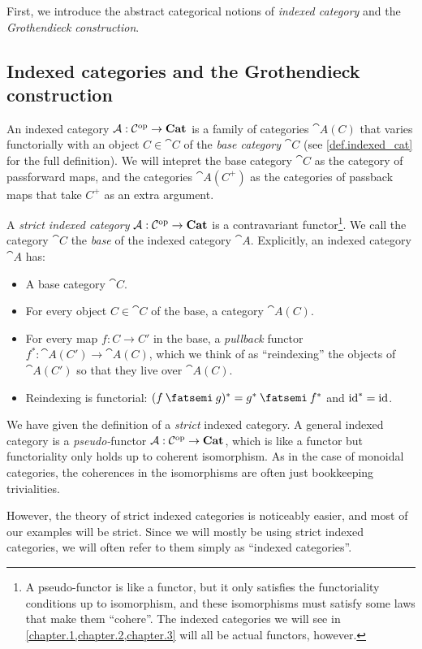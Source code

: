 \documentclass[DynamicalBook]{subfiles}
\begin{document}
First, we introduce the abstract categorical notions of \emph{indexed category}
and the \emph{Grothendieck construction}.




\subsection{Indexed categories and the Grothendieck construction}\label{sec.indexed_categories}

An indexed category $\mathcal{A} : \mathcal{C}^{\textnormal{op}} \to \textbf{Cat}$ is a family of
categories $\cat{A}(C)$ that varies functorially with an object $C \in \cat{C}$
of the \emph{base category} $\cat{C}$ (see \cref{def.indexed_cat} for the full
definition). We will intepret the base category $\cat{C}$ as the category of
passforward maps, and the categories $\cat{A}(C^+)$ as the categories of
passback maps that take $C^+$ as an extra argument.

\begin{definition}
  A \emph{strict indexed category} $\mathcal{A} : \mathcal{C}^{\textnormal{op}} \to \textbf{Cat}$ is a
  contravariant functor\footnote{A pseudo-functor is like a functor,
    but it only satisfies the functoriality conditions up to isomorphism, and
    these isomorphisms must satisfy some laws that make them ``cohere''. The
    indexed categories we will see in \cref{chapter.1,chapter.2,chapter.3}
    will all be actual functors, however.}. We call the category $\cat{C}$ the
  \emph{base} of the indexed category $\cat{A}$. Explicitly, an indexed
  category $\cat{A}$ has:
  \begin{itemize}
  \item A base category $\cat{C}$.
  \item For every object $C \in \cat{C}$ of the base, a category $\cat{A}(C)$.
  \item For every map $f : C \to C'$ in the base, a \emph{pullback} functor
    $f^{\ast} : \cat{A}(C') \to \cat{A}(C)$, which we think of as ``reindexing''
    the objects of $\cat{A}(C')$ so that they live over $\cat{A}(C)$.
  \item Reindexing is functorial: $(f \then g)^{\ast} = g^{\ast} \then f^{\ast}$
    and $\mathrm{id}^{\ast} = \mathrm{id}$.
  \end{itemize}
\end{definition}

\begin{remark}\label{rmk.co(Pseudo-functoriality)}
    We have given the definition of a \emph{strict} indexed category. A general
    indexed category is a \emph{pseudo-}functor $\mathcal{A} : \mathcal{C}^{\textnormal{op}} \to
    \textbf{Cat}$, which is like a functor but functoriality only holds up to
    coherent isomorphism. As in the case of monoidal categories, the coherences
    in the isomorphisms are often just bookkeeping trivialities. 

However, the
    theory of strict indexed categories is noticeably easier, and most of our
    examples will be strict. Since we will mostly be using strict indexed
    categories, we will often refer to them simply as ``indexed categories''.
\end{remark}
\end{document}
